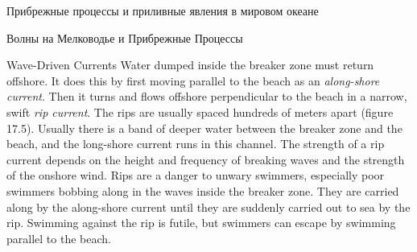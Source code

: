 \begin{chapter}{Прибрежные процессы и приливные явления в мировом океане}
\begin{section}{Волны на Мелководье и Прибрежные Процессы}
\begin{paragraph}{Wave-Driven Currents}
Water dumped inside the breaker zone must return offshore. It does this by first moving
parallel to the beach as an \textit{along-shore
current}. Then it turns and flows
offshore perpendicular to the beach in a narrow, swift \textit{rip
current}. The rips are
usually spaced hundreds of meters apart (figure 17.5). Usually there
is a band of deeper water between the breaker zone and the beach, and
the long-shore current runs in this channel. The strength of a rip
current depends on the height and frequency of
breaking waves and the strength of the onshore wind. Rips are a danger
to unwary swimmers, especially poor swimmers bobbing along in the
waves inside the breaker zone. They are carried along by the
along-shore current until they are suddenly carried out to sea by the
rip. Swimming against the rip is futile, but swimmers can escape by
swimming parallel to the beach.
%


\end{paragraph}
\end{section}
\end{chapter}
